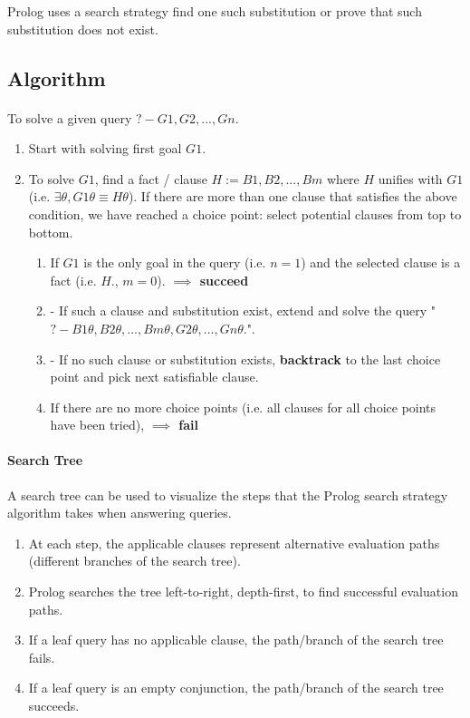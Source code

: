 \documentclass{article}
\begin{document}
\begin{multicols}{2}
  Prolog uses a search strategy find one such substitution or prove that such substitution does not exist.
  
  \subsection{Algorithm}
  
  \paragraph{} To solve a given query $?- G1, G2, ..., Gn.$
  
  \begin{enumerate}
  \item Start with solving first goal $G1$.
  \item To solve $G1$, find a fact / clause $H := B1, B2, ..., Bm$ where $H$ unifies with $G1$ (i.e. $\exists\theta, G1\theta \equiv H\theta$). If there are more than one clause that satisfies the above condition, we have reached a choice point: select potential clauses from top to bottom. 
  \begin{enumerate}
  \item If $G1$ is the only goal in the query (i.e. $n=1$) and the selected clause is a fact (i.e. $H.$, $m=0$). {\bf $\implies$ succeed}
  \item - If such a clause and substitution exist, extend and solve the query "$?- B1\theta, B2\theta, ..., Bm\theta, G2\theta, ..., Gn\theta.$".
  \item - If no such clause or substitution exists, {\bf backtrack} to the last choice point and pick next satisfiable clause.
  \item If there are no more choice points (i.e. all clauses for all choice points have been tried), {\bf $\implies$ fail}
  \end{enumerate}
  \end{enumerate}
  
  \paragraph{Search Tree} A search tree can be used to visualize the steps that the Prolog search strategy algorithm takes when answering queries.
  
  \begin{enumerate}
  \item At each step, the applicable clauses represent alternative evaluation paths (different branches of the search tree).
  \item Prolog searches the tree left-to-right, depth-first, to find successful evaluation paths.
  \item If a leaf query has no applicable clause, the path/branch of the search tree fails.
  \item If a leaf query is an empty conjunction, the path/branch of the search tree succeeds.
  \end{enumerate}
  

\end{multicols}
\end{document}

